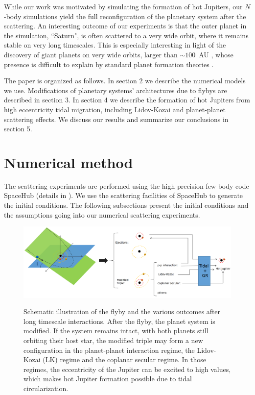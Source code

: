 \documentclass[twocolumn]{aastex63}
\begin{document}
 While our work was motivated by simulating the formation of hot Jupiters, our $N$-body simulations yield the full reconfiguration of the planetary system after the scattering. An interesting outcome of our experiments is that the outer planet in the simulation, ``Saturn", is often scattered to a very wide orbit, where it remains stable on very long timescales. This is especially interesting in light of the discovery of giant planets on very wide orbits, larger than $\sim 100$~AU \citep{Lafreniere2011}, whose presence is difficult to explain by standard planet formation theories \citep{Boss2011,Perets2012}.


The paper is organized as follows. In section 2 we describe the numerical models we use. Modifications of planetary systems' architectures due to flybys are described in section 3. In section 4 we describe the formation of hot Jupiters from high eccentricity tidal migration, including Lidov-Kozai and planet-planet scattering effects. We discuss our results and summarize our conclusions in section 5.   

\section{Numerical method} \label{method}
The scattering experiments are performed using the high precision few body code SpaceHub (details in \citealt{Wang2018,Wang2019}). We use the scattering facilities of SpaceHub to generate the initial conditions. The following subsections present the initial conditions and the assumptions going into our numerical scattering experiments.


\begin{figure}
 \includegraphics[width=2\columnwidth]{schematics}\\
 \caption{Schematic illustration of the flyby and the various outcomes after long timescale interactions. After the flyby, the planet system is modified. If the system remains intact, with both planets still orbiting their host star, the modified triple may form a new configuration in the planet-planet interaction regime, the Lidov-Kozai (LK) regime and the coplanar secular regime. In those regimes, the eccentricity of the Jupiter can be excited to high values, which makes hot Jupiter formation possible due to tidal circularization.}
 \label{fig:schematics}
\end{figure}
\end{document}
